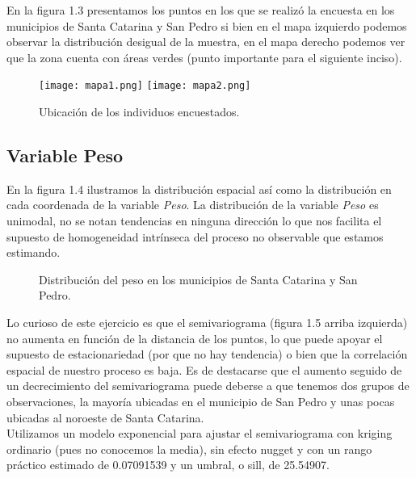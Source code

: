 \documentclass[paper=letter, fontsize=11pt]{scrartcl}
\numberwithin{equation}{section} %
\numberwithin{figure}{section} %
\numberwithin{table}{section} %
\begin{document}
\begin{enumerate}
\begin{enumerate}
En la figura 1.3 presentamos los puntos en los que se realizó la encuesta en los municipios de Santa Catarina y San Pedro si bien en el mapa izquierdo podemos observar la distribución desigual de la muestra, en el mapa derecho podemos ver que la zona cuenta con áreas verdes (punto importante para el siguiente inciso).


\begin{figure}[htbp]
\texttt{[image: mapa1.png]}
\texttt{[image: mapa2.png]}

\caption{Ubicación de los individuos encuestados.}
\label{img1}
\end{figure}
\FloatBarrier     
  
\subsection*{Variable Peso}

En la figura 1.4 ilustramos la distribución espacial así como la distribución en cada coordenada de la variable \textit{Peso}. La distribución de la variable \textit{Peso} es unimodal, no se notan tendencias en ninguna dirección lo que nos facilita el supuesto de homogeneidad intrínseca del proceso no observable que estamos estimando. 

 
  
\begin{figure}[htbp]
\caption{Distribución del peso en los municipios de Santa Catarina y San Pedro.}
\label{img1}
\end{figure}
\FloatBarrier
 
Lo curioso de este ejercicio es que el semivariograma (figura 1.5 arriba izquierda) no aumenta en función de la distancia de los puntos, lo que puede apoyar el supuesto de estacionariedad (por que no hay tendencia) o bien que la correlación espacial de nuestro proceso es baja. Es de destacarse que el aumento seguido de un decrecimiento del semivariograma puede deberse a que tenemos dos grupos de observaciones, la mayoría ubicadas en el municipio de San Pedro y unas pocas ubicadas al noroeste de Santa Catarina.  \\

Utilizamos un modelo exponencial para ajustar el semivariograma con kriging ordinario (pues no conocemos la media), sin efecto nugget y con un rango práctico estimado de 0.07091539 y un umbral, o sill, de 25.54907.\\


\end{enumerate}
\end{enumerate}
\end{document}
